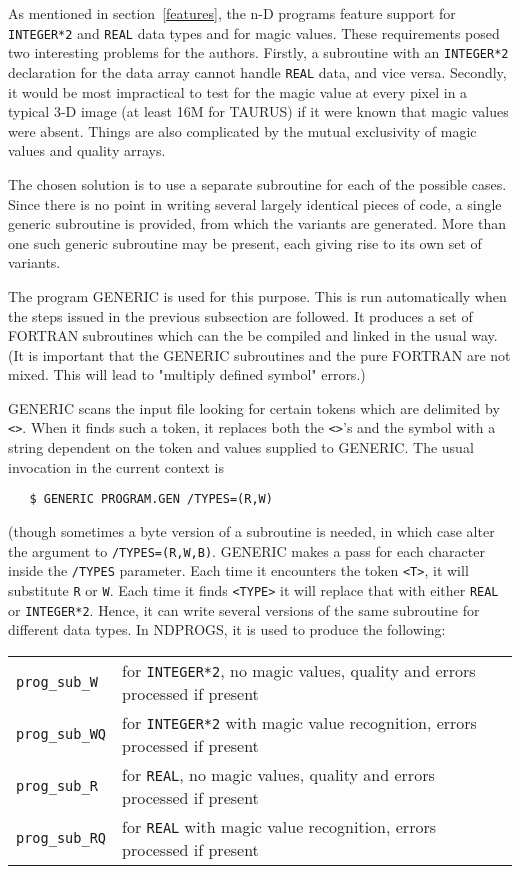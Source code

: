 As mentioned in section~\ref{features}, the n-D programs feature support for
{\tt INTEGER*2} and {\tt REAL} data types and for magic values. These 
requirements posed two interesting problems for the authors. Firstly, a
subroutine with an {\tt INTEGER*2} declaration for the data array cannot
handle {\tt REAL} data, and vice versa. Secondly, it would be most impractical
to test for the magic value at every pixel in a typical 3-D image (at least 16M
for TAURUS) if it were known that magic values were absent. Things are also
complicated by the mutual exclusivity of magic values and quality arrays.

The chosen solution is to use a separate subroutine for each of the  
possible cases. Since there is no point in writing several largely identical
pieces of code, a single generic subroutine is provided, from which the  
variants are generated. More than one such generic subroutine may be present,
each giving rise to its own set of variants.

The program GENERIC is used for this purpose. This is run automatically
when the steps issued in the previous subsection are followed. It produces a
set of FORTRAN subroutines which can the be compiled and linked in the usual
way. (It is important that the GENERIC subroutines and the pure FORTRAN are not
mixed. This will lead to "multiply defined symbol" errors.)

GENERIC scans the input file looking for certain tokens which are delimited
by {\tt <>}. When it finds such a token, it replaces both the {\tt <>}'s and 
the symbol with a string dependent on the token and values supplied to 
GENERIC. The usual invocation in the current context is
\begin{verbatim}
   $ GENERIC PROGRAM.GEN /TYPES=(R,W)
\end{verbatim}
(though sometimes a byte version of a subroutine is needed, in which case
alter the argument to {\tt /TYPES=(R,W,B)}.
GENERIC makes a pass for each character inside the {\tt /TYPES} parameter.
Each time it encounters the token {\tt <T>}, it will substitute {\tt R} or
{\tt W}. Each time it finds {\tt <TYPE>} it will replace that with either
{\tt REAL} or {\tt INTEGER*2}. Hence, it can write several versions of the same
subroutine for different data types. In NDPROGS, it is used to produce the  
following:

\vspace{2mm}
\begin{tabular}{ll}
{\tt prog\_sub\_W}  & for {\tt INTEGER*2}, no magic values, quality and errors
processed if present\\
{\tt prog\_sub\_WQ} & for {\tt INTEGER*2} with magic value recognition, errors 
processed if present\\
{\tt prog\_sub\_R}  & for {\tt REAL}, no magic values, quality and errors
processed if present \\
{\tt prog\_sub\_RQ} & for {\tt REAL} with magic value recognition, errors 
processed if present \\
\end{tabular}
\vspace{2mm}                                             

